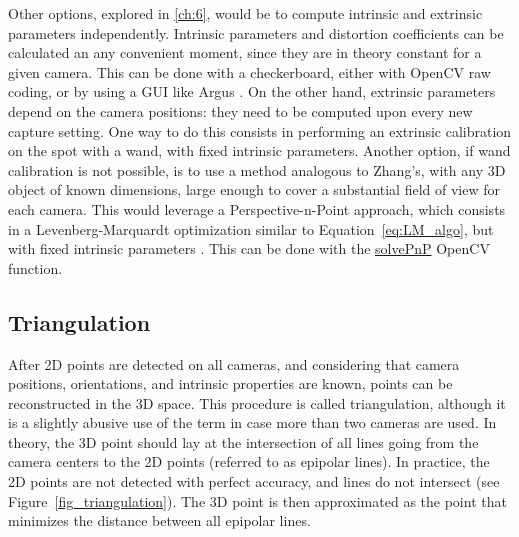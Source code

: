 Other options, explored in \autoref{ch:6}, would be to compute intrinsic and extrinsic parameters independently. Intrinsic parameters and distortion coefficients can be calculated an any convenient moment, since they are in theory constant for a given camera. This can be done with a checkerboard, either with OpenCV raw coding, or by using a GUI like Argus \cite{Argus}. On the other hand, extrinsic parameters depend on the camera positions: they need to be computed upon every new capture setting. One way to do this consists in performing an extrinsic calibration on the spot with a wand, with fixed intrinsic parameters. Another option, if wand calibration is not possible, is to use a method analogous to Zhang's, with any 3D object of known dimensions, large enough to cover a substantial field of view for each camera. This would leverage a Perspective-n-Point approach, which consists in a Levenberg-Marquardt optimization similar to Equation~\ref{eq:LM_algo}, but with fixed intrinsic parameters \cite{Marchand2015}. This can be done with the \href{https://docs.opencv.org/4.x/d9/d0c/group__calib3d.html#ga549c2075fac14829ff4a58bc931c033d}{solvePnP} OpenCV function. 



\subsection{Triangulation}\label{triangulation}
 
After 2D points are detected on all cameras, and considering that camera positions, orientations, and intrinsic properties are known, points can be reconstructed in the 3D space. This procedure is called triangulation, although it is a slightly abusive use of the term in case more than two cameras are used. In theory, the 3D point should lay at the intersection of all lines going from the camera centers to the 2D points (referred to as epipolar lines). In practice, the 2D points are not detected with perfect accuracy, and lines do not intersect (see Figure~\ref{fig_triangulation}). The 3D point is then approximated as the point that minimizes the distance between all epipolar lines.

